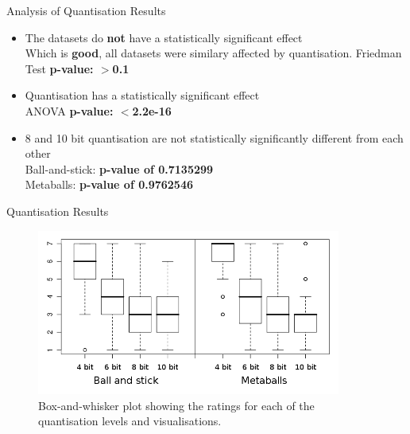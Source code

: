 \documentclass{beamer}
\begin{document}
\begin{frame}{Analysis of Quantisation Results}
\begin{itemize}

  \item The datasets do \textbf{not} have a statistically significant effect \\
  {\footnotesize Which is \textbf{good}, all datasets were similary affected by quantisation.
  Friedman Test \textbf{p-value: $>$0.1}}


  \item Quantisation has a statistically significant effect \\
  {\footnotesize ANOVA \textbf{p-value: $<$2.2e-16}}

  \item 8 and 10 bit quantisation are not statistically significantly different
  from each other \\
  {\footnotesize Ball-and-stick: \textbf{p-value of 0.7135299}} \\
  {\footnotesize Metaballs: \textbf{p-value of 0.9762546}}

\end{itemize}
\end{frame}

\begin{frame}{Quantisation Results}
\begin{figure}
  \centering
  \includegraphics[width=100mm]{min-images/bm-boxplot.png}
  \caption{Box-and-whisker plot showing the ratings for each of the quantisation levels and visualisations.}
\end{figure}
\end{frame}
\end{document}
